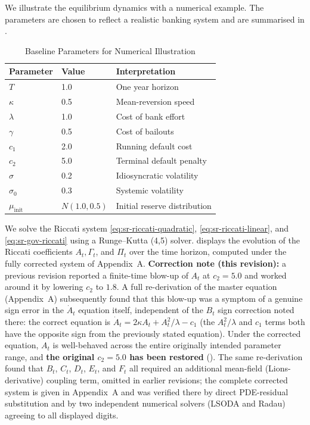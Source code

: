 We illustrate the equilibrium dynamics with a numerical example. The parameters are
chosen to reflect a realistic banking system and are summarised in
.

\begin{table}[ht]
\centering
\caption{Baseline Parameters for Numerical Illustration}
\label{tab:sr-baseline-parameters}
\begin{tabular}{lll}
\toprule
\textbf{Parameter} & \textbf{Value} & \textbf{Interpretation} \\
\midrule
$T$ & 1.0 & One year horizon \\
$\kappa$ & 0.5 & Mean-reversion speed \\
$\lambda$ & 1.0 & Cost of bank effort \\
$\gamma$ & 0.5 & Cost of bailouts \\
$c_1$ & 2.0 & Running default cost \\
$c_2$ & 5.0 & Terminal default penalty \\
$\sigma$ & 0.2 & Idiosyncratic volatility \\
$\sigma_0$ & 0.3 & Systemic volatility \\
$\mu_{\mathrm{init}}$ & $N(1.0, 0.5)$ & Initial reserve distribution \\
\bottomrule
\end{tabular}
\end{table}

We solve the Riccati system \eqref{eq:sr-riccati-quadratic},
\eqref{eq:sr-riccati-linear}, and \eqref{eq:sr-gov-riccati} using a Runge--Kutta
(4,5) solver.  displays the evolution of the
Riccati coefficients $A_t, \Gamma_t$, and $\Pi_t$ over the time horizon, computed
under the fully corrected system of Appendix~A. \textbf{Correction note (this
revision):} a previous revision reported a finite-time blow-up of $A_t$ at
$c_2=5.0$ and worked around it by lowering $c_2$ to $1.8$. A full re-derivation
of the master equation (Appendix~A) subsequently found that this blow-up was a
symptom of a genuine sign error in the $\dot{A}_t$ equation itself, independent
of the $B_t$ sign correction noted there: the correct equation is
$\dot{A}_t=2\kappa A_t+A_t^2/\lambda-c_1$ (the $A_t^2/\lambda$ and $c_1$ terms
both have the opposite sign from the previously stated equation). Under the
corrected equation, $A_t$ is well-behaved across the entire originally
intended parameter range, and \textbf{the original $c_2=5.0$ has been
restored} (). The same re-derivation found
that $B_t$, $C_t$, $D_t$, $E_t$, and $F_t$ all required an additional
mean-field (Lions-derivative) coupling term, omitted in earlier revisions;
the complete corrected system is given in Appendix~A and was verified there
by direct PDE-residual substitution and by two independent numerical solvers
(LSODA and Radau) agreeing to all displayed digits.


